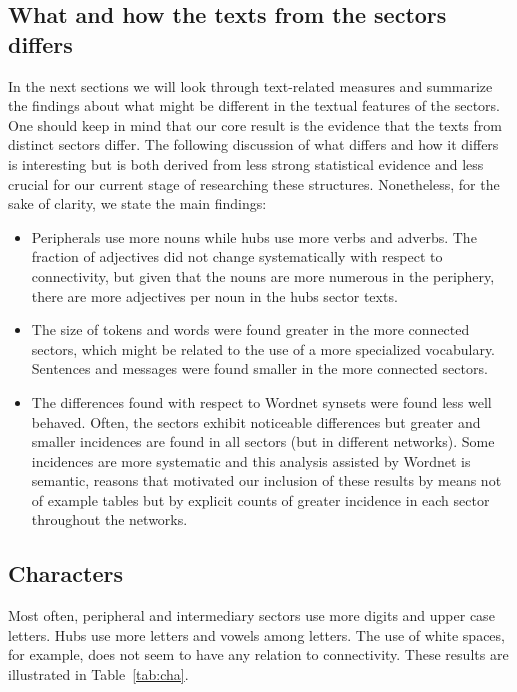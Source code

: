\subsection{What and how the texts from the sectors differs}
In the next sections we will look through text-related measures
and summarize the findings about what might be different in
the textual features of the sectors.
One should keep in mind that our core result is the evidence that
the texts from distinct sectors differ.
The following discussion of what differs and how it differs
is interesting but is both derived from less strong statistical evidence
and less crucial for our current stage of researching these structures.
Nonetheless, for the sake of clarity, we state the main findings:
\begin{itemize}
	\item Peripherals use more nouns while hubs use more verbs and adverbs.
		The fraction of adjectives did not change systematically with respect to connectivity,
		but given that the nouns are more numerous in the periphery, there are more adjectives per noun in the hubs sector texts.
	\item The size of tokens and words were found greater in the more connected sectors,
		which might be related to the use of a more specialized vocabulary.
		Sentences and messages were found smaller in the more connected sectors.
	\item The differences found with respect to Wordnet synsets were found less well behaved.
		Often, the sectors exhibit noticeable differences but greater and smaller incidences are found in all sectors (but in different networks).
		Some incidences are more systematic and this analysis assisted by Wordnet is semantic, reasons that motivated our inclusion of these results by means not of example tables but by explicit counts of greater incidence in each sector throughout the networks.
\end{itemize}



\subsection{Characters}\label{sec:cha}
Most often, peripheral and intermediary sectors use more digits and upper case letters.
Hubs use more letters and vowels among letters.
The use of white spaces, for example, does not seem to have any relation to connectivity. 
These results are illustrated in Table~\ref{tab:cha}.

\FloatBarrier

